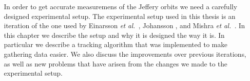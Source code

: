 In order to get accurate measuremens of the Jeffery orbits we need a carefully designed experimental setup. The experimental setup used in this thesis is an iteration of the one used by Einarsson \emph{et al.}~\cite{JonasExperiment}, Johansson \cite{AntonThesis}, and Mishra \emph{et al.}~\cite{Mishra}. In this chapter we describe the setup and why it is designed the way it is. In particular we describe a tracking algorithm that was implemented to make gathering data easier. We also discuss the improvements over previous iterations, as well as new problems that have arisen from the changes we made to the experimental setup. 